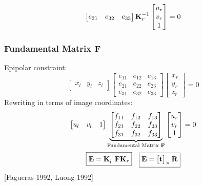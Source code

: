 \begin{frame}
{\begin{equation*}
\begin{bmatrix}
            e_{31} & e_{32} & e_{33}
        \end{bmatrix}
        \boldsymbol{\mathbf{K}}_r^{-1}
        \begin{bmatrix} u_r \\ v_r \\ 1 \end{bmatrix} = 0
    \end{equation*}
    }

\end{frame}

\begin{frame}
    \frametitle{Fundamental Matrix $\mathbf{F}$}
    Epipolar constraint:
    $$
    \begin{bmatrix} x_l & y_l & z_l \end{bmatrix}
    \begin{bmatrix}
        e_{11} & e_{12} & e_{13} \\
        e_{21} & e_{22} & e_{23} \\
        e_{31} & e_{32} & e_{33}
    \end{bmatrix}
    \begin{bmatrix} x_r \\ y_r \\ z_r \end{bmatrix} = 0
    $$
    Rewriting in terms of image coordinates:
    $$
    \begin{bmatrix} u_l & v_l & 1 \end{bmatrix}
    \underbrace{\begin{bmatrix}
        f_{11} & f_{12} & f_{13} \\
        f_{21} & f_{22} & f_{23} \\
        f_{31} & f_{32} & f_{33}
    \end{bmatrix}}_{\text{Fundamental Matrix } \boldsymbol{\mathbf{F}}}
    \begin{bmatrix} u_r \\ v_r \\ 1 \end{bmatrix} = 0
    $$
    $$
    \boxed{\boldsymbol{\mathbf{E}} = \boldsymbol{\mathbf{K}}_l^{\top} \boldsymbol{\mathbf{F}} \boldsymbol{\mathbf{K}}_r}
    \quad
    \boxed{\boldsymbol{\mathbf{E}} = \begin{bmatrix}\boldsymbol{\mathbf{t}}\end{bmatrix}_{\times} \boldsymbol{\mathbf{R}}}
    $$
    \footnotesize{[Fagueras 1992, Luong 1992]}
\end{frame}


